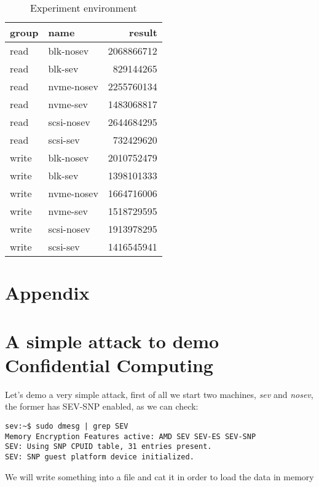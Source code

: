 \documentclass[twocolumn]{article}
\begin{document}
\begin{table*}
    \centering
    \label{tab:bw-results}
    \begin{tabular}{|l|l|r|}
    \hline
        group &       name &       result \\
    \hline
    read &  blk-nosev & 2068866712 \\
    read &    blk-sev &  829144265 \\
    read & nvme-nosev & 2255760134 \\
    read &   nvme-sev & 1483068817 \\
    read & scsi-nosev & 2644684295 \\
    read &   scsi-sev &  732429620 \\
    write &  blk-nosev & 2010752479 \\
    write &    blk-sev & 1398101333 \\
    write & nvme-nosev & 1664716006 \\
    write &   nvme-sev & 1518729595 \\
    write & scsi-nosev & 1913978295 \\
    write &   scsi-sev & 1416545941 \\
    \hline
    \end{tabular}
    \caption{Experiment environment}
\end{table*}







\printbibliography
\appendix
\section*{Appendix}
\section{A simple attack to demo Confidential Computing}
Let's demo a very simple attack, first of all we start two machines, \textit{sev} and \textit{nosev}, the former has SEV-SNP enabled, as we can check:

\begin{verbatim}
sev:~$ sudo dmesg | grep SEV
Memory Encryption Features active: AMD SEV SEV-ES SEV-SNP
SEV: Using SNP CPUID table, 31 entries present.
SEV: SNP guest platform device initialized.
\end{verbatim}

We will write something into a file and cat it in order to load the data in memory
\end{document}
